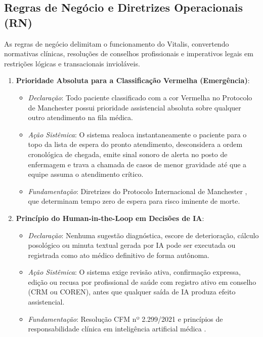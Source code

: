\endgroup

\subsection{Regras de Negócio e Diretrizes Operacionais (RN)}

As regras de negócio delimitam o funcionamento do Vitalis, convertendo normativas clínicas, resoluções de conselhos profissionais e imperativos legais em restrições lógicas e transacionais invioláveis.

\begin{enumerate}[label=\textbf{RN-\arabic*:}, leftmargin=*]
    \item \textbf{Prioridade Absoluta para a Classificação Vermelha (Emergência)}:
    \begin{itemize}[noitemsep]
        \item \textit{Declaração}: Todo paciente classificado com a cor Vermelha no Protocolo de Manchester possui prioridade assistencial absoluta sobre qualquer outro atendimento na fila médica.
        \item \textit{Ação Sistêmica}: O sistema realoca instantaneamente o paciente para o topo da lista de espera do pronto atendimento, desconsidera a ordem cronológica de chegada, emite sinal sonoro de alerta no posto de enfermagem e trava a chamada de casos de menor gravidade até que a equipe assuma o atendimento crítico.
        \item \textit{Fundamentação}: Diretrizes do Protocolo Internacional de Manchester \cite{manchester:2014}, que determinam tempo zero de espera para risco iminente de morte.
    \end{itemize}

    \item \textbf{Princípio do Human-in-the-Loop em Decisões de IA}:
    \begin{itemize}[noitemsep]
        \item \textit{Declaração}: Nenhuma sugestão diagnóstica, escore de deterioração, cálculo posológico ou minuta textual gerada por IA pode ser executada ou registrada como ato médico definitivo de forma autônoma.
        \item \textit{Ação Sistêmica}: O sistema exige revisão ativa, confirmação expressa, edição ou recusa por profissional de saúde com registro ativo em conselho (CRM ou COREN), antes que qualquer saída de IA produza efeito assistencial.
        \item \textit{Fundamentação}: Resolução CFM nº 2.299/2021 \cite{cfm_digital:2021} e princípios de responsabilidade clínica em inteligência artificial médica \cite{topol:2019}.
    \end{itemize}


\end{enumerate}
